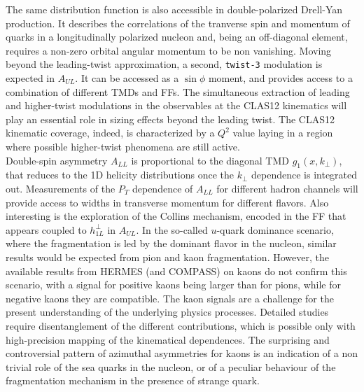 The same distribution function is also accessible in double-polarized Drell-Yan production.
It describes the correlations of the tranverse spin and momentum of quarks in a longitudinally polarized nucleon and, being an off-diagonal element, requires a non-zero orbital angular momentum to be non vanishing.
%
Moving beyond the leading-twist approximation, a second, \texttt{twist-3} modulation is expected in $A_{UL}$. It can be accessed as a $\sin\phi$ moment, and provides access to a combination of different TMDs and FFs. The simultaneous extraction of leading and higher-twist modulations in the observables at the CLAS12 kinematics will play an essential role in sizing effects beyond the leading twist. The CLAS12 kinematic coverage, indeed, is characterized by a $Q^2$ value laying in a region where possible higher-twist phenomena are still active.\\ %
%
Double-spin asymmetry $A_{LL}$ is proportional to the diagonal TMD $g_1(x, k_\perp)$, that reduces to the 1D helicity distributions once the $k_\perp$ dependence is integrated out. Measurements of the $P_T$ dependence of $A_{LL}$
for different hadron channels will provide access to widths in transverse momentum for different flavors.
%
%
Also interesting is the exploration of the Collins mechanism, encoded in the FF that appears coupled to $h_{1 L}^{\perp}$ in $A_{UL}$.
In the so-called $u$-quark dominance scenario, where the fragmentation is led by the dominant flavor in the nucleon, similar results would be expected from pion and kaon fragmentation. However, the available results from HERMES (and COMPASS) 
on kaons do not confirm this scenario, with a signal for positive kaons being larger than for pions, while for negative kaons they are compatible. The kaon signals are a challenge for the present understanding of the underlying physics processes. Detailed studies require disentanglement of the different contributions, which is possible only
with high-precision mapping of the kinematical dependences.
The surprising and controversial pattern of azimuthal asymmetries for kaons is an
indication of a non trivial role of the sea quarks in the nucleon, or of a peculiar behaviour
of the fragmentation mechanism in the presence of strange quark.\\

